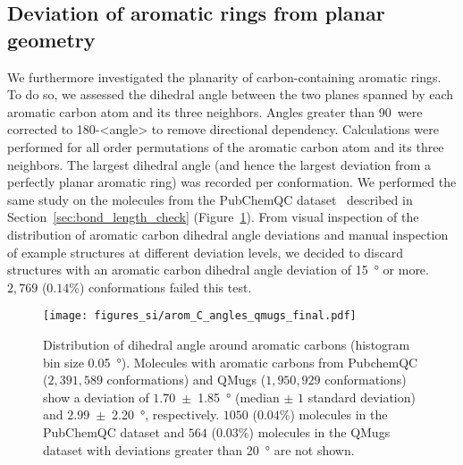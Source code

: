 \subsection{Deviation of aromatic rings from planar geometry}
\label{sec:planar_rings}
We furthermore investigated the planarity of carbon-containing aromatic rings. To do so, we assessed the dihedral angle between the two planes spanned by each aromatic carbon atom and its three neighbors. Angles greater than $90$\textdegree ~were corrected to 180\textdegree-<angle> to remove directional dependency. Calculations were performed for all order permutations of the aromatic carbon atom and its three neighbors. The largest dihedral angle (and hence the largest deviation from a perfectly planar aromatic ring) was recorded per conformation. We performed the same study on the molecules from the PubChemQC dataset~\cite{nakata2017pubchemqc} described in Section~\ref{sec:bond_length_check} (Figure~\ref{fig:carbon_C_angle}). From visual inspection of the distribution of aromatic carbon dihedral angle deviations
and manual inspection of example structures at different deviation levels, we decided to discard structures with an aromatic carbon dihedral angle deviation of \SI{15}{\degree} or more. $2,769$ ($0.14$\%) conformations failed this test.

\begin{figure}[H]
\centering
\texttt{[image: figures\_si/arom\_C\_angles\_qmugs\_final.pdf]}
\caption{Distribution of dihedral angle around aromatic carbons (histogram bin size \SI{0.05}{\degree}). Molecules with aromatic carbons from PubchemQC ($2,391,589$ conformations) and QMugs ($1,950,929$ conformations) show a deviation of $1.70$~$\pm$~\SI{1.85}{\degree} (median $\pm$ $1$ standard deviation) and $2.99$~$\pm$~\SI{2.20}{\degree}, respectively. $1050$ ($0.04$\%) molecules in the PubChemQC dataset and $564$ ($0.03$\%) molecules in the QMugs dataset with deviations greater than \SI{20}{\degree} are not shown.} 
\label{fig:carbon_C_angle}
\end{figure}
\noindent


